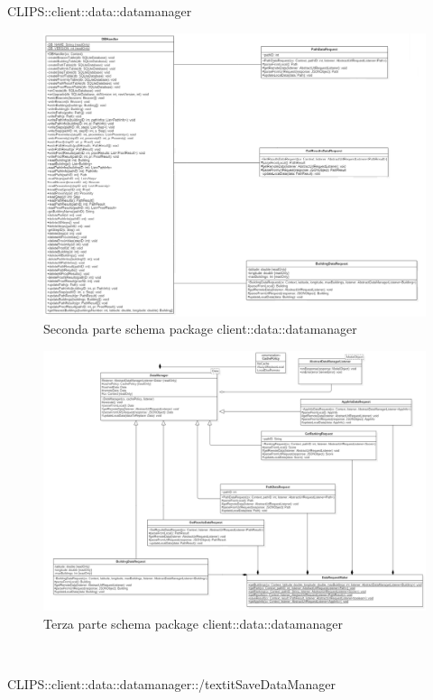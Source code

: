 \begin{componente}{CLIPS::client::data::datamanager}
\begin{figure}[h!]
	\includegraphics[scale=0.4]{img/package/png/client--datamanager2.png}
	\caption{Seconda parte schema package client::data::datamanager}
\end{figure}
\begin{figure}[h!]
	\centering
	\includegraphics[scale=0.35]{img/package/png/client--datamanager3.png}
	\caption{Terza parte schema package client::data::datamanager}
\end{figure}
\begin{compClassi} \\ 
\begin{classe}{CLIPS::client::data::datamanager::/textit{SaveDataManager}}

\end{classe}
\end{compClassi}
\end{componente}
